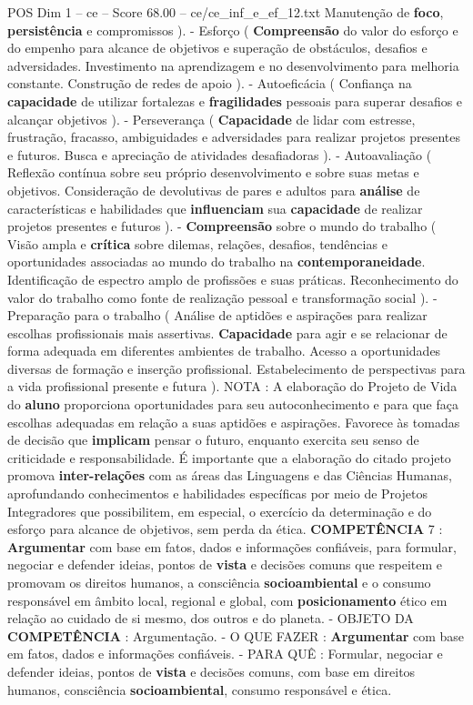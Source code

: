 \begin{textsample}{POS Dim 1 – ce – Score 68.00 – ce/ce\_inf\_e\_ef\_12.txt}
Manutenção de \textbf{foco}, \textbf{persistência} e compromissos ). - Esforço ( \textbf{Compreensão} do valor do esforço e do empenho para alcance de objetivos e superação de obstáculos, desafios e adversidades.
Investimento na aprendizagem e no desenvolvimento para melhoria constante.
Construção de redes de apoio ). - Autoeficácia ( Confiança na \textbf{capacidade} de utilizar fortalezas e \textbf{fragilidades} pessoais para superar desafios e alcançar objetivos ). - Perseverança ( \textbf{Capacidade} de lidar com estresse, frustração, fracasso, ambiguidades e adversidades para realizar projetos presentes e futuros.
Busca e apreciação de atividades desafiadoras ). - Autoavaliação ( Reflexão contínua sobre seu próprio desenvolvimento e sobre suas metas e objetivos.
Consideração de devolutivas de pares e adultos para \textbf{análise} de características e habilidades que \textbf{influenciam} sua \textbf{capacidade} de realizar projetos presentes e futuros ). - \textbf{Compreensão} sobre o mundo do trabalho ( Visão ampla e \textbf{crítica} sobre dilemas, relações, desafios, tendências e oportunidades associadas ao mundo do trabalho na \textbf{contemporaneidade}.
Identificação de espectro amplo de profissões e suas práticas.
Reconhecimento do valor do trabalho como fonte de realização pessoal e transformação social ). - Preparação para o trabalho ( Análise de aptidões e aspirações para realizar escolhas profissionais mais assertivas. \textbf{Capacidade} para agir e se relacionar de forma adequada em diferentes ambientes de trabalho.
Acesso a oportunidades diversas de formação e inserção profissional.
Estabelecimento de perspectivas para a vida profissional presente e futura ).
NOTA : A elaboração do Projeto de Vida do \textbf{aluno} proporciona oportunidades para seu autoconhecimento e para que faça escolhas adequadas em relação a suas aptidões e aspirações.
Favorece às tomadas de decisão que \textbf{implicam} pensar o futuro, enquanto exercita seu senso de criticidade e responsabilidade.
É importante que a elaboração do citado projeto promova \textbf{inter-relações} com as áreas das Linguagens e das Ciências Humanas, aprofundando conhecimentos e habilidades específicas por meio de Projetos Integradores que possibilitem, em especial, o exercício da determinação e do esforço para alcance de objetivos, sem perda da ética. \textbf{COMPETÊNCIA} 7 : \textbf{Argumentar} com base em fatos, dados e informações confiáveis, para formular, negociar e defender ideias, pontos de \textbf{vista} e decisões comuns que respeitem e promovam os direitos humanos, a consciência \textbf{socioambiental} e o consumo responsável em âmbito local, regional e global, com \textbf{posicionamento} ético em relação ao cuidado de si mesmo, dos outros e do planeta. - OBJETO DA \textbf{COMPETÊNCIA} : Argumentação. - O QUE FAZER : \textbf{Argumentar} com base em fatos, dados e informações confiáveis. - PARA QUÊ : Formular, negociar e defender ideias, pontos de \textbf{vista} e decisões comuns, com base em direitos humanos, consciência \textbf{socioambiental}, consumo responsável e ética.

\end{textsample}
